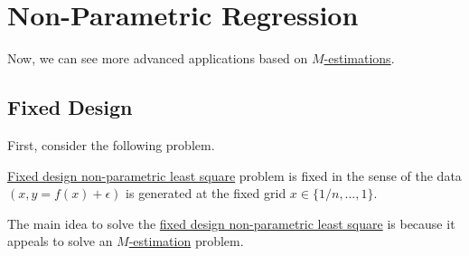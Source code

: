 \section{Non-Parametric Regression}
Now, we can see more advanced applications based on \hyperref[prb:M-estimation]{\(M\)-estimations}.

\subsection{Fixed Design}
First, consider the following problem.


\begin{notation}
	\hyperref[prb:fixed-design-non-parametric-LS]{Fixed design non-parametric least square} problem is fixed in the sense of the data \((x, y = f(x) + \epsilon )\) is generated at the fixed grid \(x\in \{ 1 / n, \dots , 1 \} \).
\end{notation}

The main idea to solve the \hyperref[prb:fixed-design-non-parametric-LS]{fixed design non-parametric least square} is because it appeals to solve an \hyperref[prb:M-estimation]{\(M\)-estimation} problem.

